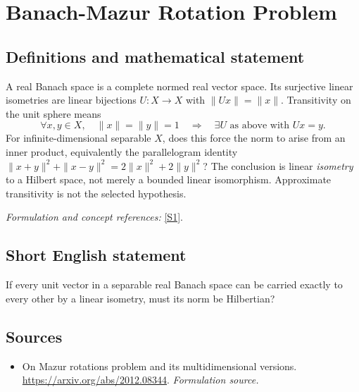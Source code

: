 \documentclass[11pt]{article}
\begin{document}
\section*{\texorpdfstring{Banach-Mazur Rotation Problem}{Banach-Mazur Rotation Problem}}\label{249}
\subsection{Definitions and mathematical statement}
A real Banach space is a complete normed real vector space. Its surjective linear isometries are linear bijections $U:X\to X$ with $\|Ux\|=\|x\|$. Transitivity on the unit sphere means
\[
 \forall x,y\in X,\quad\|x\|=\|y\|=1
 \quad\Longrightarrow\quad\exists U\text{ as above with }Ux=y.
\]
For infinite-dimensional separable $X$, does this force the norm to arise from an inner product, equivalently the parallelogram identity
$\|x+y\|^2+\|x-y\|^2=2\|x\|^2+2\|y\|^2$?
The conclusion is linear \emph{isometry} to a Hilbert space, not merely a bounded linear isomorphism. Approximate transitivity is not the selected hypothesis.
\par\smallskip\textit{Formulation and concept references:} \href{https://arxiv.org/abs/2012.08344}{[S1]}.

\subsection{Short English statement}
If every unit vector in a separable real Banach space can be carried exactly to every other by a linear isometry, must its norm be Hilbertian?
\subsection{Sources}
\begin{itemize}
\item[S1]On Mazur rotations problem and its multidimensional versions.
\url{https://arxiv.org/abs/2012.08344}.
\textit{Formulation source.}
\end{itemize}
\end{document}
